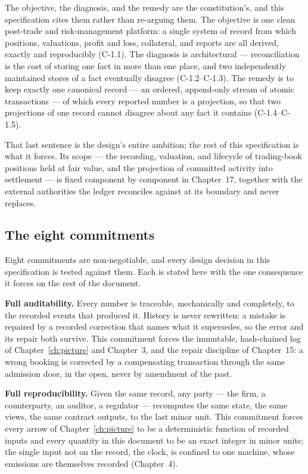 The objective, the diagnosis, and the remedy are the constitution's, and this
specification cites them rather than re-arguing them. The objective is one clean
post-trade and risk-management platform: a single system of record from which
positions, valuations, profit and loss, collateral, and reports are all derived,
exactly and reproducibly (C-1.1). The diagnosis is architectural --- reconciliation is
the cost of storing one fact in more than one place, and two independently maintained
stores of a fact eventually disagree (C-1.2--C-1.3). The remedy is to keep exactly one
canonical record --- an ordered, append-only stream of atomic transactions --- of which
every reported number is a projection, so that two projections of one record cannot
disagree about any fact it contains (C-1.4--C-1.5).

That last sentence is the design's entire ambition; the rest of this specification is
what it forces. Its scope --- the recording, valuation, and lifecycle of trading-book
positions held at fair value, and the projection of committed activity into settlement
--- is fixed component by component in Chapter~17, together with the external
authorities the ledger reconciles against at its boundary and never replaces.

\subsection{The eight commitments}

Eight commitments are non-negotiable, and every design decision in this specification is
tested against them. Each is stated here with the one consequence it forces on the
rest of the document.

\textbf{Full auditability.} Every number is traceable, mechanically and completely, to
the recorded events that produced it. History is never rewritten: a mistake is
repaired by a recorded correction that names what it supersedes, so the error and its
repair both survive. This commitment forces the immutable, hash-chained log of
Chapter~\ref{ch:picture} and Chapter~3, and the repair discipline of Chapter~15: a
wrong booking is corrected by a compensating transaction through the same admission
door, in the open, never by amendment of the past.

\textbf{Full reproducibility.} Given the same record, any party --- the firm, a
counterparty, an auditor, a regulator --- recomputes the same state, the same views,
the same contract outputs, to the last minor unit. This commitment forces every arrow
of Chapter~\ref{ch:picture} to be a deterministic function of recorded inputs and
every quantity in this document to be an exact integer in minor units; the single
input not on the record, the clock, is confined to one machine, whose emissions are
themselves recorded (Chapter~4).

